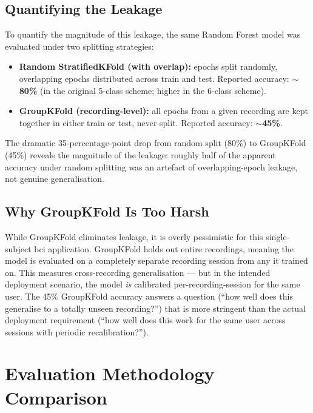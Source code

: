 \subsection{Quantifying the Leakage}

To quantify the magnitude of this leakage, the same Random Forest
model was evaluated under two splitting strategies:

\begin{itemize}[leftmargin=*]
    \item \textbf{Random StratifiedKFold (with overlap):} epochs
    split randomly, overlapping epochs distributed across train and
    test. Reported accuracy: \textbf{$\sim$80\%} (in the original
    5-class scheme; higher in the 6-class scheme).
    \item \textbf{GroupKFold (recording-level):} all epochs from a
    given recording are kept together in either train or test,
    never split. Reported accuracy: \textbf{$\sim$45\%}.
\end{itemize}

The dramatic 35-percentage-point drop from random split (80\%) to
GroupKFold (45\%) reveals the magnitude of the leakage: roughly
half of the apparent accuracy under random splitting was an
artefact of overlapping-epoch leakage, not genuine generalisation.

\subsection{Why GroupKFold Is Too Harsh}

While GroupKFold eliminates leakage, it is overly pessimistic for
this single-subject \acrshort{bci} application. GroupKFold holds out
entire recordings, meaning the model is evaluated on a completely
separate recording session from any it trained on. This measures
cross-recording generalisation — but in the intended deployment
scenario, the model \textit{is} calibrated per-recording-session
for the same user. The 45\% GroupKFold accuracy answers a question
(``how well does this generalise to a totally unseen recording?'')
that is more stringent than the actual deployment requirement
(``how well does this work for the same user across sessions with
periodic recalibration?'').

\section{Evaluation Methodology Comparison}
\label{sec:cl_eval}

